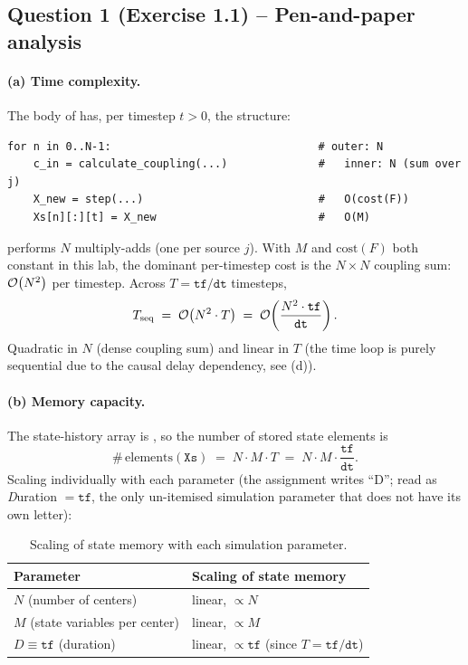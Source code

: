 \documentclass[11pt, a4paper]{article}
\begin{document}
\subsection{Question 1 (Exercise 1.1) -- Pen-and-paper analysis}

\paragraph{(a) Time complexity.}
The body of  has, per timestep $t > 0$, the structure:
\begin{lstlisting}[style=shell, numbers=none]
for n in 0..N-1:                                # outer: N
    c_in = calculate_coupling(...)              #   inner: N (sum over j)
    X_new = step(...)                           #   O(cost(F))
    Xs[n][:][t] = X_new                         #   O(M)
\end{lstlisting}
 performs $N$ multiply-adds (one per source $j$).
With $M$ and $\mathrm{cost}(F)$ both constant in this lab, the dominant
per-timestep cost is the $N \times N$ coupling sum: $\mathcal{O}\!\left(N^2\right)$ per
timestep. Across $T = \mathtt{tf}/\mathtt{dt}$ timesteps,
\[
T_{\text{seq}} \;=\; \mathcal{O}\!\left(N^2 \cdot T\right) \;=\; \mathcal{O}\!\left(\frac{N^2 \cdot \mathtt{tf}}{\mathtt{dt}}\right).
\]
Quadratic in $N$ (dense coupling sum) and linear in $T$ (the time loop is
purely sequential due to the causal delay dependency, see (d)).

\paragraph{(b) Memory capacity.}
The state-history array is , so the number of stored
state elements is
\[
\#\,\text{elements}(\mathtt{Xs}) \;=\; N \cdot M \cdot T \;=\; N \cdot M \cdot \frac{\mathtt{tf}}{\mathtt{dt}}.
\]
Scaling individually with each parameter (the assignment writes ``D'';
read as \emph{D}uration $= \mathtt{tf}$, the only un-itemised simulation
parameter that does not have its own letter):

\begin{table}[H]
\centering
\caption{Scaling of state memory with each simulation parameter.}
\label{tab:q1b-scaling}
\begin{tabular}{ll}
\toprule
Parameter & Scaling of state memory \\
\midrule
$N$ (number of centers)            & linear, $\propto N$ \\
$M$ (state variables per center)   & linear, $\propto M$ \\
$D \equiv \mathtt{tf}$ (duration)  & linear, $\propto \mathtt{tf}$ (since $T = \mathtt{tf}/\mathtt{dt}$) \\
\bottomrule
\end{tabular}
\end{table}
\end{document}
